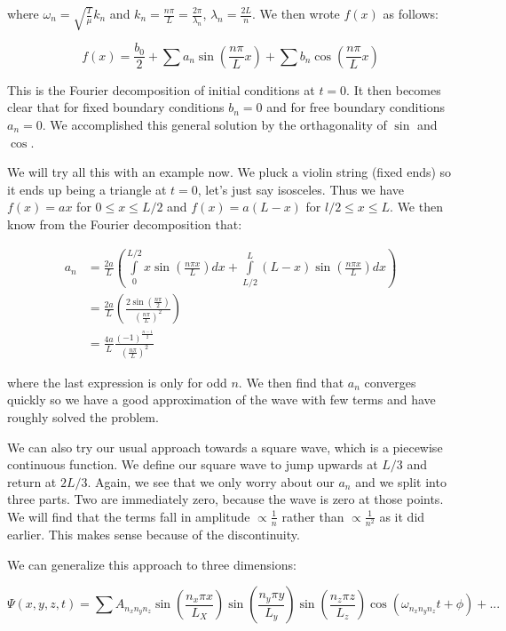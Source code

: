 \documentclass{report}
\begin{document}
where $\omega_n = \sqrt{\frac{T}{\mu}} k_n$ and $k_n = \frac{n\pi}{L} = \frac{2\pi}{\lambda_n}$, $\lambda_n = \frac{2L}{n}$. We then wrote $f(x)$ as follows:

$$f(x) = \frac{b_0}{2} + \sum{a_n \sin\left(\frac{n\pi}{L}x\right)} + \sum{b_n \cos\left(\frac{n\pi}{L}x\right)}$$

This is the Fourier decomposition of initial conditions at $t=0$. It then becomes clear that for fixed boundary conditions $b_n = 0$ and for free boundary conditions $a_n = 0$. We accomplished this general solution by the orthagonality of $\sin$ and $\cos$. 

We will try all this with an example now. We pluck a violin string (fixed ends) so it ends up being a triangle at $t=0$, let's just say isosceles. Thus we have $f(x) = ax$ for $0 \leq x \leq L/2$ and $f(x) = a(L-x)$ for $l/2 \leq x \leq L$. We then know from the Fourier decomposition that:

\begin{align*}
a_n &= \frac{2a}{L}\left(\displaystyle\int\limits_0^{L/2}{x\sin(\frac{n\pi x}{L})dx} + \displaystyle\int\limits_{L/2}^L{(L-x)\sin(\frac{n\pi x}{L})dx}\right)\\
&= \frac{2a}{L}\left(\frac{2\sin(\frac{n\pi}{2})}{\left(\frac{n\pi}{L}\right)^2}\right)\\
&= \frac{4a}{L}\frac{(-1)^{\frac{n-1}{2}}}{(\frac{n\pi}{L})^2}
\end{align*}

where the last expression is only for odd $n$. We then find that $a_n$ converges quickly so we have a good approximation of the wave with few terms and have roughly solved the problem.

We can also try our usual approach towards a square wave, which is a piecewise continuous function. We define our square wave to jump upwards at $L/3$ and return at $2L/3$. Again, we see that we only worry about our $a_n$ and we split into three parts. Two are immediately zero, because the wave is zero at those points. We will find that the terms fall in amplitude $\propto \frac{1}{n}$ rather than $\propto \frac{1}{n^2}$ as it did earlier. This makes sense because of the discontinuity. 

We can generalize this approach to three dimensions:

$$\Psi(x,y,z,t) = \sum{A_{n_xn_yn_z}\sin\left(\frac{n_x\pi x}{L_X}\right)\sin\left(\frac{n_y\pi y}{L_y}\right)\sin\left(\frac{n_z \pi z}{L_z}\right)\cos(\omega_{n_xn_yn_z} t + \phi) +...}$$
\end{document}
